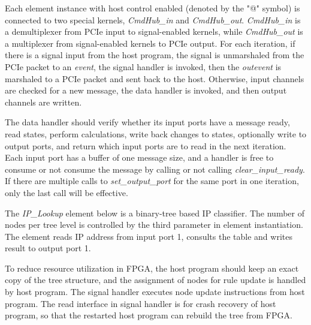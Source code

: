 Each element instance with host control enabled (denoted by the "@" symbol) is connected to two special kernels, \textit{CmdHub\_in} and \textit{CmdHub\_out}. \textit{CmdHub\_in} is a demultiplexer from PCIe input to signal-enabled kernels, while \textit{CmdHub\_out} is a multiplexer from signal-enabled kernels to PCIe output. For each iteration, if there is a signal input from the host program, the signal is unmarshaled from the PCIe packet to an \textit{event}, the signal handler is invoked, then the \textit{outevent} is marshaled to a PCIe packet and sent back to the host. Otherwise, input channels are checked for a new message, the data handler is invoked, and then output channels are written.

The data handler should verify whether its input ports have a message ready, read states, perform calculations, write back changes to states, optionally write to output ports, and return which input ports are to read in the next iteration. Each input port has a buffer of one message size, and a handler is free to consume or not consume the message by calling or not calling \textit{clear\_input\_ready}. If there are multiple calls to \textit{set\_output\_port} for the same port in one iteration, only the last call will be effective.

The \textit{IP\_Lookup} element below is a binary-tree based IP classifier. The number of nodes per tree level is controlled by the third parameter in element instantiation. The element reads IP address from input port 1, consults the table and writes result to output port 1.

To reduce resource utilization in FPGA, the host program should keep an exact copy of the tree structure, and the assignment of nodes for rule update is handled by host program. The signal handler executes node update instructions from host program. The read interface in signal handler is for crash recovery of host program, so that the restarted host program can rebuild the tree from FPGA.

